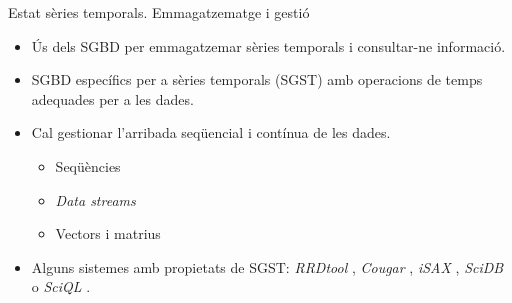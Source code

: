 \begin{frame}{Estat sèries temporals. Emmagatzematge i gestió}

  \begin{itemize}

  \item Ús dels SGBD per emmagatzemar sèries temporals i consultar-ne
    informació.

  \item SGBD específics per a sèries temporals
    (SGST) \parencite{dreyer94} amb operacions de temps adequades per
    a les dades.

  \item Cal gestionar l'arribada seqüencial i contínua de les dades.

    \begin{itemize}

    \item  Seqüències \parencite{seshadri95}

    \item \emph{Data streams} \parencite{babcock02}

    \item Vectors i matrius \parencite{stonebraker09:scidb,zhang11}

    \end{itemize}


  \item Alguns sistemes amb propietats de SGST:
    \emph{RRDtool} \parencite{rrdtool},
    \emph{Cougar} \parencite{cougar},
    \emph{iSAX} \parencite{keogh10:isax},
    \emph{SciDB} \parencite{stonebraker09:scidb} o
    \emph{SciQL} \parencite{zhang11}.
  \end{itemize}



\end{frame}




